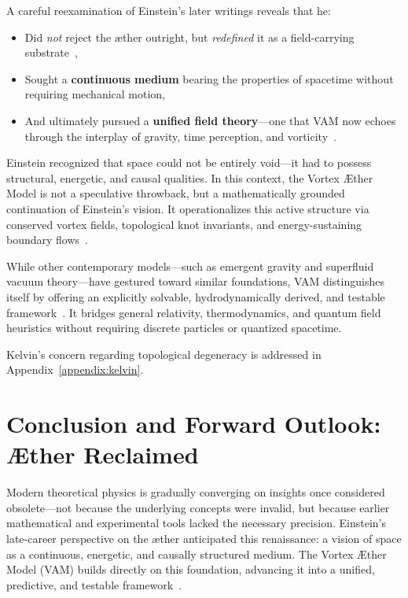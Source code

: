 A careful reexamination of Einstein's later writings reveals that he:
\begin{itemize}
    \item Did \emph{not} reject the æther outright, but \emph{redefined} it as a field-carrying substrate~\cite{einstein1920aether},
    \item Sought a \textbf{continuous medium} bearing the properties of spacetime without requiring mechanical motion,
    \item And ultimately pursued a \textbf{unified field theory}—one that VAM now echoes through the interplay of gravity, time perception, and vorticity~\cite{VAM-8, VAM-14}.
\end{itemize}

Einstein recognized that space could not be entirely void—it had to possess structural, energetic, and causal qualities. In this context, the Vortex Æther Model is not a speculative throwback, but a mathematically grounded continuation of Einstein's vision. It operationalizes this active structure via conserved vortex fields, topological knot invariants, and energy-sustaining boundary flows~\cite{VAM-8, VAM-11, VAM-14}.

While other contemporary models—such as emergent gravity and superfluid vacuum theory—have gestured toward similar foundations, VAM distinguishes itself by offering an explicitly solvable, hydrodynamically derived, and testable framework~\cite{VAM-8, VAM-14, VAM-15}. It bridges general relativity, thermodynamics, and quantum field heuristics without requiring discrete particles or quantized spacetime.

Kelvin's concern regarding topological degeneracy is addressed in Appendix~\ref{appendix:kelvin}.


\section*{Conclusion and Forward Outlook: Æther Reclaimed}

Modern theoretical physics is gradually converging on insights once considered obsolete—not because the underlying concepts were invalid, but because earlier mathematical and experimental tools lacked the necessary precision. Einstein’s late-career perspective on the æther anticipated this renaissance: a vision of space as a continuous, energetic, and causally structured medium. The Vortex Æther Model (VAM) builds directly on this foundation, advancing it into a unified, predictive, and testable framework~\cite{VAM-8, VAM-13, VAM-14}.

